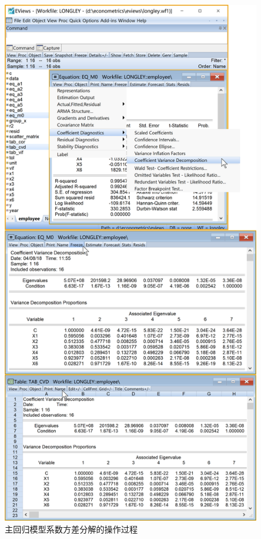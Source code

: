 \documentclass[12pt,(landscape,a4paper),(portrait,a4paper)]{article}
\begin{document}
\begin{figure}

{\centering \includegraphics[width=8in]{picture/lab5-multilinearity/4-table-cvd} 

}

\caption{主回归模型系数方差分解的操作过程}\label{fig:fig-cvd}
\end{figure}
\end{document}
